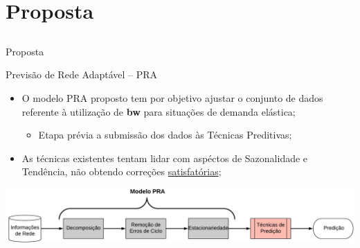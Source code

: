 \documentclass[aspectratio=169]{beamer}
\begin{document}
\section{Proposta}
\subsection{}
\begin{frame}{Proposta}
    \begin{block}{Previsão de Rede Adaptável -- PRA}
        \begin{itemize}\small
            \item O modelo PRA proposto tem por objetivo ajustar o conjunto de dados referente à utilização de \textbf{bw} para situações de demanda elástica;
            \begin{itemize}[square]\footnotesize
                \item Etapa prévia a submissão dos dados às Técnicas Preditivas; 
            \end{itemize}
            \item As técnicas existentes tentam lidar com aspéctos de Sazonalidade e Tendência, não obtendo correções \underline{satisfatórias};
            
            
        \end{itemize}
    \end{block}
\includegraphics[width=1\textwidth,angle=0]{Modelo-PRA}
            
        
\end{frame}
\end{document}
